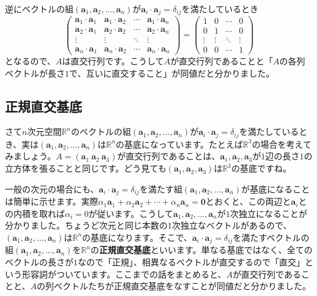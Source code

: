 逆にベクトルの組$(\bm{a}_1, \bm{a}_2, \ldots, \bm{a}_n)$が$\bm{a}_i \cdot \bm{a}_j =\delta_{ij}$を満たしているとき
\[
\begin{pmatrix}
\bm{a}_1 \cdot \bm{a}_1 & \bm{a}_1 \cdot \bm{a}_2 & \cdots & \bm{a}_1 \cdot \bm{a}_n \\
\bm{a}_2 \cdot \bm{a}_1 & \bm{a}_2 \cdot \bm{a}_2 & \cdots & \bm{a}_2 \cdot \bm{a}_n \\
\vdots & \vdots & \ddots & \vdots \\
\bm{a}_n \cdot \bm{a}_1 & \bm{a}_n \cdot \bm{a}_2 & \cdots & \bm{a}_n \cdot \bm{a}_n
\end{pmatrix}
=
\begin{pmatrix}
1 & 0 & \cdots & 0 \\
0 & 1 & \cdots & 0 \\
\vdots & \vdots & \ddots & \vdots \\
0 & 0 & \cdots & 1
\end{pmatrix}
\]
となるので、$A$は直交行列です。こうして$A$が直交行列であることと「$A$の各列ベクトルが長さ$1$で、互いに直交すること」が同値だと分かりました。

\subsection{正規直交基底}

さて$n$次元空間$\mathbb{R}^n$のベクトルの組$(\bm{a}_1, \bm{a}_2, \ldots, \bm{a}_n)$が$\bm{a}_i \cdot \bm{a}_j =\delta_{ij}$を満たしているとき、実は$(\bm{a}_1, \bm{a}_2, \ldots, \bm{a}_n)$は$\mathbb{R}^n$の基底になっています。たとえば$\mathbb{R}^3$の場合を考えてみましょう。$A = (\bm{a}_1 \ \bm{a}_2 \ \bm{a}_3)$が直交行列であることは、$\bm{a}_1, \bm{a}_2, \bm{a}_3$が$1$辺の長さ$1$の立方体を張ることと同じです。どう見ても$(\bm{a}_1, \bm{a}_2, \bm{a}_3)$は$\mathbb{R}^3$の基底ですね。

一般の次元の場合にも、$\bm{a}_i \cdot \bm{a}_j =\delta_{ij}$を満たす組$(\bm{a}_1, \bm{a}_2, \ldots, \bm{a}_n)$が基底になることは簡単に示せます。実際$\alpha_1 \bm{a}_1 + \alpha_2 \bm{a}_2 + \cdots + \alpha_n \bm{a}_n = \bm{0}$とおくと、この両辺と$\bm{a}_i$との内積を取れば$\alpha_i = 0$が従います。こうして$\bm{a}_1, \bm{a}_2, \ldots, \bm{a}_n$が$1$次独立になることが分かりました。ちょうど次元と同じ本数の$1$次独立なベクトルがあるので、$(\bm{a}_1, \bm{a}_2, \ldots, \bm{a}_n)$は$\mathbb{R}^n$の基底になります。そこで、$\bm{a}_i \cdot \bm{a}_j = \delta_{ij}$を満たすベクトルの組$(\bm{a}_1, \bm{a}_2, \ldots, \bm{a}_n)$を$\mathbb{R}^n$の\textbf{正規直交基底}といいます。単なる基底ではなく、全てのベクトルの長さが$1$なので「正規」、相異なるベクトルが直交するので「直交」という形容詞がついています。ここまでの話をまとめると、$A$が直交行列であることと、$A$の列ベクトルたちが正規直交基底をなすことが同値だと分かりました。


